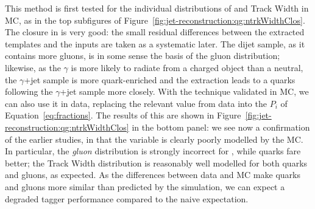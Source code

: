 This method is first tested for the individual distributions of \ntrk and Track Width in MC, as in the top subfigures of Figure~\ref{fig:jet-reconstruction:qg:ntrkWidthClos}. The closure in \Pythia is very good: the small residual differences between the extracted templates and the inputs are taken as a systematic later. The dijet sample, as it contains more gluons, is in some sense the basis of the gluon distribution; likewise, as the $\gamma$ is more likely to radiate from a charged object than a neutral, the $\gamma$+jet sample is more quark-enriched and the extraction leads to a quarks following the $\gamma$+jet sample more closely. With the technique validated in MC, we can also use it in data, replacing the relevant value from data into the $P_i$ of Equation~\ref{eq:fractions}. The results of this are shown in Figure~\ref{fig:jet-reconstruction:qg:ntrkWidthClos} in the bottom panel: we see now a confirmation of the earlier studies, in that the \ntrk variable is clearly poorly modelled by the MC. In particular, the \textit{gluon} distribution is strongly incorrect for \ntrk, while quarks fare better; the Track Width distribution is reasonably well modelled for both quarks and gluons, as expected. As the differences between data and MC make quarks and gluons more similar than predicted by the simulation, we can expect a degraded tagger performance compared to the naive expectation.


\begin{figure*}[p]
\begin{center}
 \\
\caption{ Average (a,c) \ntrk and (b,d) track width for quark- (solid symbols) and gluon-jets
(open symbols) as a function of reconstructed jet $\pt$ for isolated jets with $|\eta|<0.8$.
Results are shown for distributions obtained using the in-situ extraction method in
 simulation (black circles, (a,b)) or data (black circles, (c,d)), as well as for 
labeled jets in the dijet sample (triangles) and in the $\gamma$+jet sample (squares).
The error bars represent only statistical uncertainties. Isolated jets are reconstructed using the
\akt jet algorithm with radius parameter $R=0.4$. The bottom panels show
the ratio of the results obtained with the in-situ extraction method to the results
in the dijet and $\gamma$+jet MC samples. }
\label{fig:jet-reconstruction:qg:ntrkWidthClos}
\end{center}
\end{figure*}

